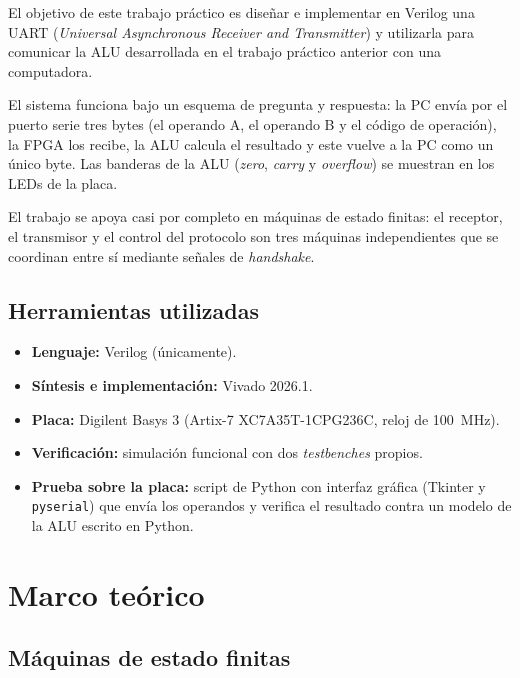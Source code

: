 \documentclass[12pt,a4paper]{article}
\begin{document}
El objetivo de este trabajo práctico es diseñar e implementar en Verilog una
UART (\emph{Universal Asynchronous Receiver and Transmitter}) y utilizarla para
comunicar la ALU desarrollada en el trabajo práctico anterior con una
computadora.

El sistema funciona bajo un esquema de pregunta y respuesta: la PC envía por el
puerto serie tres bytes (el operando A, el operando B y el código de operación),
la FPGA los recibe, la ALU calcula el resultado y este vuelve a la PC como un
único byte. Las banderas de la ALU (\emph{zero}, \emph{carry} y
\emph{overflow}) se muestran en los LEDs de la placa.

El trabajo se apoya casi por completo en máquinas de estado finitas: el
receptor, el transmisor y el control del protocolo son tres máquinas
independientes que se coordinan entre sí mediante señales de \emph{handshake}.

\subsection{Herramientas utilizadas}

\begin{itemize}[nosep]
  \item \textbf{Lenguaje:} Verilog (únicamente).
  \item \textbf{Síntesis e implementación:} Vivado 2026.1.
  \item \textbf{Placa:} Digilent Basys 3 (Artix-7 XC7A35T-1CPG236C, reloj de 100~MHz).
  \item \textbf{Verificación:} simulación funcional con dos \emph{testbenches} propios.
  \item \textbf{Prueba sobre la placa:} script de Python con interfaz gráfica
        (Tkinter y \texttt{pyserial}) que envía los operandos y verifica el
        resultado contra un modelo de la ALU escrito en Python.
\end{itemize}

\section{Marco teórico}

\subsection{Máquinas de estado finitas}
\end{document}

